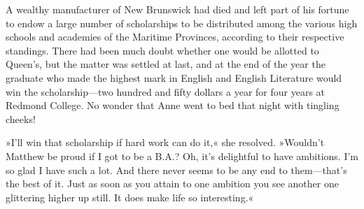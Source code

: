 A wealthy manufacturer of New Brunswick had died and left part of his fortune to endow a large number of scholarships to be distributed among the various high schools and academies of the Maritime Provinces, according to their respective standings. There had been much doubt whether one would be allotted to Queen's, but the matter was settled at last, and at the end of the year the graduate who made the highest mark in English and English Literature would win the scholarship—two hundred and fifty dollars a year for four years at Redmond College. No wonder that Anne went to bed that night with tingling cheeks!

»I'll win that scholarship if hard work can do it,« she resolved. »Wouldn't Matthew be proud if I got to be a B.A.? Oh, it's delightful to have ambitions. I'm so glad I have such a lot. And there never seems to be any end to them—that's the best of it. Just as soon as you attain to one ambition you see another one glittering higher up still. It does make life so interesting.«